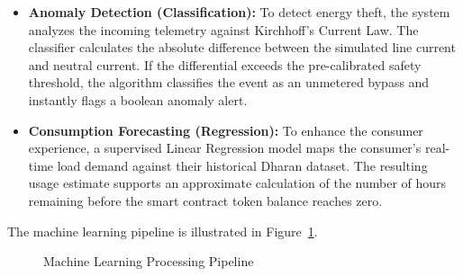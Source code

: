 \begin{itemize}

\item \textbf{Anomaly Detection (Classification):} To detect energy theft, the system analyzes the incoming telemetry against Kirchhoff's Current Law. The classifier calculates the absolute difference between the simulated line current and neutral current. If the differential exceeds the pre-calibrated safety threshold, the algorithm classifies the event as an unmetered bypass and instantly flags a boolean anomaly alert.

\item \textbf{Consumption Forecasting (Regression):} To enhance the consumer experience, a supervised Linear Regression model maps the consumer's real-time load demand against their historical Dharan dataset. The resulting usage estimate supports an approximate calculation of the number of hours remaining before the smart contract token balance reaches zero.

\end{itemize}

The machine learning pipeline is illustrated in Figure~\ref{fig:ml-pipeline}.

\begin{figure}[H]
\centering
{}
\caption{Machine Learning Processing Pipeline}\label{fig:ml-pipeline}
\end{figure}


